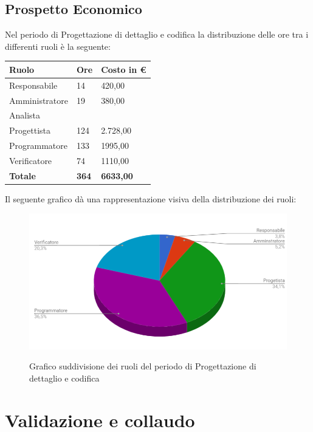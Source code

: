 \documentclass[PianoDiProgetto.tex]{subfiles}
\begin{document}
\subsection{Prospetto Economico}
Nel periodo di Progettazione di dettaglio e codifica la distribuzione delle ore tra i differenti ruoli è la seguente:\begin{center}
\begin{table}[htbp]
	\centering
	\renewcommand\arraystretch{1.5}
	\begin{tabularx}{\textwidth}{p{5cm}|p{4cm}|p{4cm}}
		\hline
		\textbf{Ruolo} & \textbf{Ore} & \textbf{Costo in \euro} \\
		\hline
		Responsabile & 14 & 420,00 \\
		\hline
		Amministratore & 19 & 380,00 \\
		\hline
		Analista & \ & \ \\
		\hline
		Progettista & 124 & 2.728,00 \\
		\hline
		Programmatore & 133 & 1995,00 \\
		\hline
		Verificatore & 74 & 1110,00 \\
		\hline
		\textbf{Totale} & \textbf{364} & \textbf{6633,00}\\
		\hline
	\end{tabularx}
\end{table} 
\end{center}
Il seguente grafico dà una rappresentazione visiva della distribuzione dei ruoli:
\begin{figure}[h]
	\includegraphics[width=12.5cm]{images/prospettoEconomico/progCod.png}
	\label{fig:foo}
	\caption{Grafico suddivisione dei ruoli del periodo di Progettazione di dettaglio e codifica}
\end{figure} 
\clearpage

\section{Validazione e collaudo}
\end{document}
